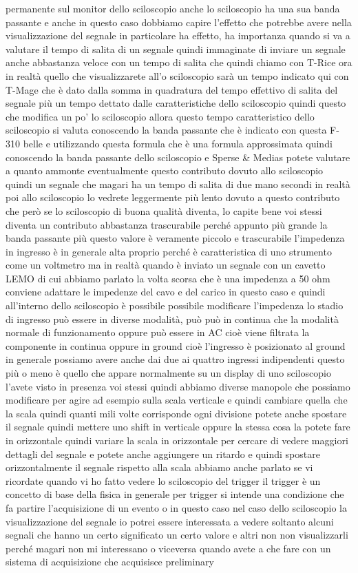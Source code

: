 {permanente sul monitor dello sciloscopio anche lo sciloscopio ha una sua banda passante e anche in questo caso dobbiamo capire l'effetto che potrebbe avere nella visualizzazione del segnale in particolare ha effetto, ha importanza quando si va a valutare il tempo di salita di un segnale quindi immaginate di inviare un segnale anche abbastanza veloce con un tempo di salita che quindi chiamo con T-Rice ora in realtà quello che visualizzarete all'o sciloscopio sarà un tempo indicato qui con T-Mage che è dato dalla somma in quadratura del tempo effettivo di salita del segnale più un tempo dettato dalle caratteristiche dello sciloscopio quindi questo che modifica un po' lo sciloscopio allora questo tempo caratteristico dello sciloscopio si valuta conoscendo la banda passante che è indicato con questa F-310 belle e utilizzando questa formula che è una formula approssimata quindi conoscendo la banda passante dello sciloscopio e Sperse \& Medias potete valutare a quanto ammonte eventualmente questo contributo dovuto allo sciloscopio quindi un segnale che magari ha un tempo di salita di due mano secondi in realtà poi allo sciloscopio lo vedrete leggermente più lento dovuto a questo contributo che però se lo sciloscopio di buona qualità diventa, lo capite bene voi stessi diventa un contributo abbastanza trascurabile perché appunto più grande la banda passante più questo valore è veramente piccolo e trascurabile l'impedenza in ingresso è in generale alta proprio perché è caratteristica di uno strumento come un voltmetro ma in realtà quando è inviato un segnale con un cavetto LEMO di cui abbiamo parlato la volta scorsa che è una impedenza a 50 ohm conviene adattare le impedenze del cavo e del carico in questo caso e quindi all'interno dello sciloscopio è possibile possibile modificare l'impedenza lo stadio di ingresso può essere in diverse modalità, può può in continua che la modalità normale di funzionamento oppure può essere in AC cioè viene filtrata la componente in continua oppure in ground cioè l'ingresso è posizionato al ground in generale possiamo avere anche dai due ai quattro ingressi indipendenti questo più o meno è quello che appare normalmente su un display di uno sciloscopio l'avete visto in presenza voi stessi quindi abbiamo diverse manopole che possiamo modificare per agire ad esempio sulla scala verticale e quindi cambiare quella che la scala quindi quanti mili volte corrisponde ogni divisione potete anche spostare il segnale quindi mettere uno shift in verticale oppure la stessa cosa la potete fare in orizzontale quindi variare la scala in orizzontale per cercare di vedere maggiori dettagli del segnale e potete anche aggiungere un ritardo e quindi spostare orizzontalmente il segnale rispetto alla scala abbiamo anche parlato se vi ricordate quando vi ho fatto vedere lo sciloscopio del trigger il trigger è un concetto di base della fisica in generale per trigger si intende una condizione che fa partire l'acquisizione di un evento o in questo caso nel caso dello sciloscopio la visualizzazione del segnale io potrei essere interessata a vedere soltanto alcuni segnali che hanno un certo significato un certo valore e altri non non visualizzarli perché magari non mi interessano o viceversa quando avete a che fare con un sistema di acquisizione che acquisisce preliminary }
